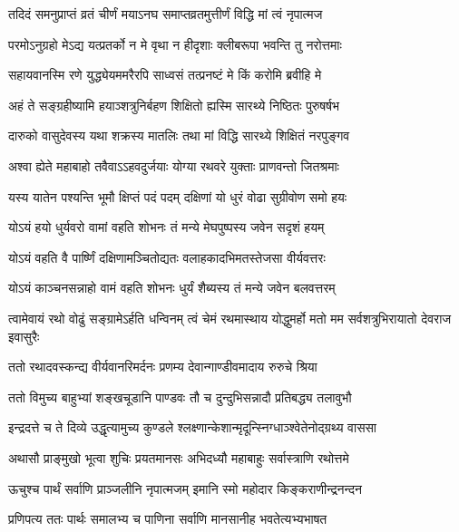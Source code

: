 \twolineshloka
{तदिदं समनुप्राप्तं व्रतं चीर्णं मयाऽनघ}
{समाप्तव्रतमुत्तीर्णं विद्धि मां त्वं नृपात्मज}




\twolineshloka
{परमोऽनुग्रहो मेऽद्य यत्प्रतर्को न मे वृथा}
{न हीदृशाः क्लीबरूपा भवन्ति तु नरोत्तमाः}


\twolineshloka
{सहायवानस्मि रणे युद्ध्येयममरैरपि}
{साध्वसं तत्प्रनष्टं मे किं करोमि ब्रवीहि मे}


\twolineshloka
{अहं ते सङ्ग्रहीष्यामि हयाञ्शत्रुनिर्बहण}
{शिक्षितो ह्यस्मि सारथ्ये निष्ठितः पुरुषर्षभ}


\twolineshloka
{दारुको वासुदेवस्य यथा शक्रस्य मातलिः}
{तथा मां विद्धि सारथ्ये शिक्षितं नरपुङ्गव}


\twolineshloka
{अश्वा ह्येते महाबाहो तवैवाऽऽहवदुर्जयाः}
{योग्या रथवरे युक्ताः प्राणवन्तो जितश्रमाः}


\twolineshloka
{यस्य यातेन पश्यन्ति भूमौ क्षिप्तं पदं पदम्}
{दक्षिणां यो धुरं वोढा सुग्रीवोण समो हयः}


\twolineshloka
{योऽयं हयो धुर्यवरो वामां वहति शोभनः}
{तं मन्ये मेघपुष्पस्य जवेन सदृशं हयम्}


\twolineshloka
{योऽयं वहति वै पार्ष्णिं दक्षिणामञ्चितोद्यतः}
{वलाहकादभिमतस्तेजसा वीर्यवत्तरः}


\twolineshloka
{योऽयं काञ्चनसन्नाहो वामं वहति शोभनः}
{धुर्यं शैब्यस्य तं मन्ये जवेन बलवत्तरम्}


\threelineshloka
{त्वामेवायं रथो वोढुं सङ्ग्रामेऽर्हति धन्विनम्}
{त्वं चेमं रथमास्थाय योद्धुमर्हो मतो मम}
{सर्वशत्रुभिरायातो देवराज इवासुरैः}



\twolineshloka
{ततो रथादवस्कन्द्य वीर्यवानरिमर्दनः}
{प्रणम्य देवान्गाण्डीवमादाय रुरुचे श्रिया}


\twolineshloka
{ततो विमुच्य बाहुभ्यां शङ्खचूडानि पाण्डवः}
{तौ च दुन्दुभिसन्नादौ प्रतिबद्ध्य तलावुभौ}


\twolineshloka
{इन्द्रदत्ते च ते दिव्ये उद्धृत्यामुच्य कुण्डले}
{श्लक्ष्णान्केशान्मृदून्स्निग्धाञ्श्वेतेनोद्ग्रथ्य वाससा}


\twolineshloka
{अथासौ प्राङ्मुखो भूत्वा शुचिः प्रयतमानसः}
{अभिदध्यौ महाबाहुः सर्वास्त्राणि रथोत्तमे}


\twolineshloka
{ऊचुश्च पार्थं सर्वाणि प्राञ्जलीनि नृपात्मजम्}
{इमानि स्मो महोदार किङ्कराणीन्द्रनन्दन}


\twolineshloka
{प्रणिपत्य ततः पार्थः समालभ्य च पाणिना}
{सर्वाणि मानसानीह भवतेत्यभ्यभाषत}


